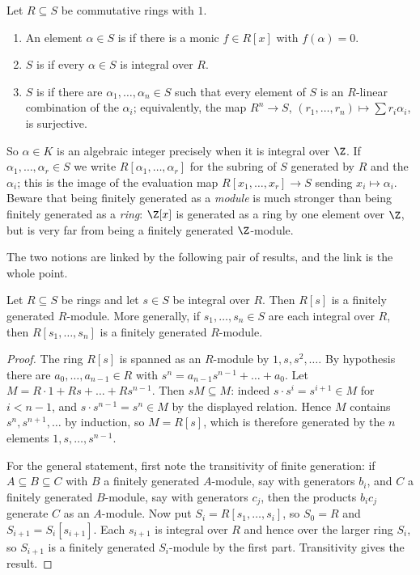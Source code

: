 \begin{definition}[Integral]
	Let $R \subseteq S$ be commutative rings with $1$.
	\begin{enumerate}[label=(\roman*)]
		\item An element $\alpha \in S$ is  if there is a monic $f \in R[x]$ with $f(\alpha) = 0$.
		\item $S$ is  if every $\alpha \in S$ is integral over $R$.
		\item $S$ is  if there are $\alpha_1, \dots, \alpha_n \in S$ such that every element of $S$ is an $R$-linear combination of the $\alpha_i$; equivalently, the map $R^n \to S$, $(r_1,\dots,r_n) \mapsto \sum r_i\alpha_i$, is surjective.
	\end{enumerate}
\end{definition}

So $\alpha \in K$ is an algebraic integer precisely when it is integral over $\Z$. If $\alpha_1, \dots, \alpha_r \in S$ we write $R[\alpha_1, \dots, \alpha_r]$ for the subring of $S$ generated by $R$ and the $\alpha_i$; this is the image of the evaluation map $R[x_1,\dots,x_r] \to S$ sending $x_i \mapsto \alpha_i$. Beware that being finitely generated as a \emph{module} is much stronger than being finitely generated as a \emph{ring}: $\Z[x]$ is generated as a ring by one element over $\Z$, but is very far from being a finitely generated $\Z$-module.

The two notions are linked by the following pair of results, and the link is the whole point.

\begin{proposition}\label{prop:intfg}
	Let $R \subseteq S$ be rings and let $s \in S$ be integral over $R$. Then $R[s]$ is a finitely generated $R$-module. More generally, if $s_1, \dots, s_n \in S$ are each integral over $R$, then $R[s_1, \dots, s_n]$ is a finitely generated $R$-module.
\end{proposition}

\begin{proof}
	The ring $R[s]$ is spanned as an $R$-module by $1, s, s^2, \dots$. By hypothesis there are $a_0, \dots, a_{n-1} \in R$ with $s^n = a_{n-1}s^{n-1} + \dots + a_0$. Let $M = R \cdot 1 + Rs + \dots + Rs^{n-1}$. Then $sM \subseteq M$: indeed $s \cdot s^i = s^{i+1} \in M$ for $i < n-1$, and $s\cdot s^{n-1} = s^n \in M$ by the displayed relation. Hence $M$ contains $s^n, s^{n+1}, \dots$ by induction, so $M = R[s]$, which is therefore generated by the $n$ elements $1, s, \dots, s^{n-1}$.

	For the general statement, first note the transitivity of finite generation: if $A \subseteq B \subseteq C$ with $B$ a finitely generated $A$-module, say with generators $b_i$, and $C$ a finitely generated $B$-module, say with generators $c_j$, then the products $b_ic_j$ generate $C$ as an $A$-module. Now put $S_i = R[s_1,\dots,s_i]$, so $S_0 = R$ and $S_{i+1} = S_i[s_{i+1}]$. Each $s_{i+1}$ is integral over $R$ and hence over the larger ring $S_i$, so $S_{i+1}$ is a finitely generated $S_i$-module by the first part. Transitivity gives the result.
\end{proof}

